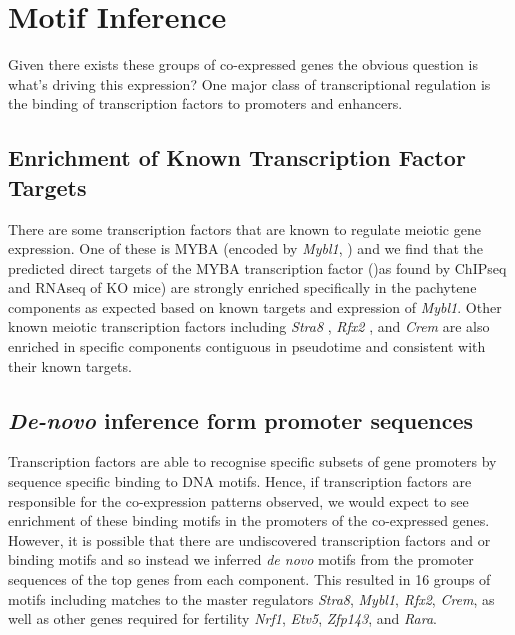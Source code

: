 \section{Motif Inference}
Given there exists these groups of co-expressed genes the obvious question is what's driving this expression? One major class of transcriptional regulation is the binding of transcription factors to promoters and enhancers.

\subsection{Enrichment of Known Transcription Factor Targets}
There are some transcription factors that are known to regulate meiotic gene expression. One of these is MYBA (encoded by \textit{Mybl1}, \cite{Bolcun-Filas2011AMYB}) and we find that the predicted direct targets of the MYBA transcription factor ()as found by ChIPseq and RNAseq of KO mice) are strongly enriched specifically in the pachytene components as expected based on known targets and expression of \textit{Mybl1}. Other known meiotic transcription factors including \textit{Stra8} \parencite{Kojima2019Amplification}, \textit{Rfx2} \parencite{Kistler2015RFX2}, and \textit{Crem} \parencite{Nantel1996Spermiogenesis} are also enriched in specific components contiguous in pseudotime and consistent with their known targets.


\subsection{\emph{De-novo} inference form promoter sequences}
Transcription factors are able to recognise specific subsets of gene promoters by sequence specific binding to DNA motifs. Hence, if transcription factors are responsible for the co-expression patterns observed, we would expect to see enrichment of these binding motifs in the promoters of the co-expressed genes. However, it is possible that there are undiscovered transcription factors and or binding motifs and so instead we inferred \textit{de novo} motifs from the promoter sequences of the top genes from each component. This resulted in 16 groups of motifs including matches to the master regulators \textit{Stra8}, \textit{Mybl1}, \textit{Rfx2}, \textit{Crem}, as well as other genes required for fertility \textit{Nrf1}, \textit{Etv5}, \textit{Zfp143}, and \textit{Rara}.

